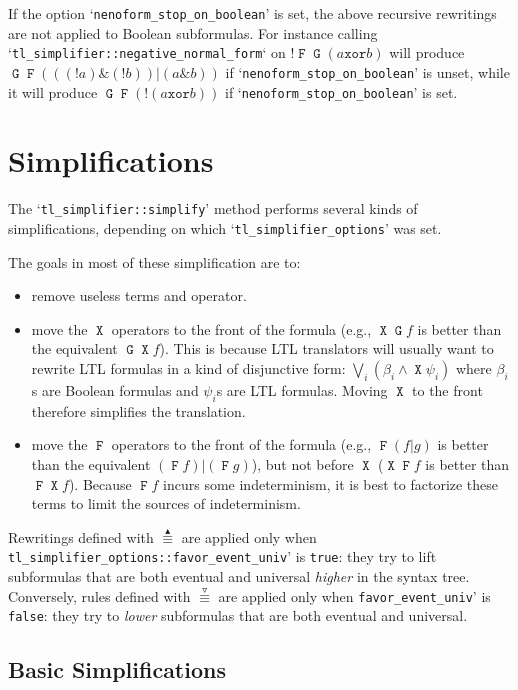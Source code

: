 \documentclass[a4paper,twoside,10pt,DIV=12]{scrreprt}
\DeclareMathOperator{\F}{\texttt{F}}
\DeclareMathOperator{\G}{\texttt{G}}
\DeclareMathOperator{\X}{\texttt{X}}
\DeclareMathOperator{\NOT}{\texttt{!}}
\newcommand{\XOR}{\mathbin{\texttt{xor}}}
\newcommand{\OR}{\mathbin{\texttt{|}}}
\newcommand{\AND}{\mathbin{\texttt{\&}}}
\newcommand{\0}{\texttt{0}}
\newcommand{\1}{\texttt{1}}
\newcommand{\equivEU}{\stackrel{\blacktriangleup}{\equiv}}
\newcommand{\equivNeu}{\stackrel{\smalltriangledown}{\equiv}}
\begin{document}
If the option `\verb|nenoform_stop_on_boolean|' is set, the above
recursive rewritings are not applied to Boolean subformulas.  For
instance calling `\verb|tl_simplifier::negative_normal_form|` on
$\NOT\F\G(a \XOR b)$ will produce $\G\F(((\NOT a)\AND(\NOT
b))\OR(a\AND b))$ if `\verb|nenoform_stop_on_boolean|' is unset, while
it will produce $\G\F(\NOT(a \XOR b))$ if
`\verb|nenoform_stop_on_boolean|' is set.

\section{Simplifications}

The `\verb|tl_simplifier::simplify|' method performs several kinds of
simplifications, depending on which `\verb|tl_simplifier_options|'
was set.

The goals in most of these simplification are to:
\begin{itemize}
\item remove useless terms and operator.
\item move the $\X$ operators to the front of the formula (e.g., $\X\G
  f$ is better than the equivalent $\G\X f$).  This is because LTL
  translators will usually want to rewrite LTL formulas in
  a kind of disjunctive form: $\displaystyle\bigvee_i
  \left(\beta_i\land\X\psi_i\right)$ where $\beta_i$s are Boolean
  formulas and $\psi_i$s are LTL formulas.  Moving $\X$ to the
  front therefore simplifies the translation.
\item move the $\F$ operators to the front of the formula (e.g., $\F(f
  \OR g)$ is better than the equivalent $(\F f)\OR (\F g)$), but not
  before $\X$ ($\X\F f$ is better than $\F\X f$).  Because $\F f$
  incurs some indeterminism, it is best to factorize these terms to
  limit the sources of indeterminism.
\end{itemize}

Rewritings defined with $\equivEU$ are applied only when
\verb|tl_simplifier_options::favor_event_univ|' is \texttt{true}:
they try to lift subformulas that are both eventual and universal
\emph{higher} in the syntax tree.  Conversely, rules defined with $\equivNeu$
are applied only when \verb|favor_event_univ|' is \texttt{false}: they
try to \textit{lower} subformulas that are both eventual and universal.

\subsection{Basic Simplifications}\label{sec:basic-simp}
\end{document}

